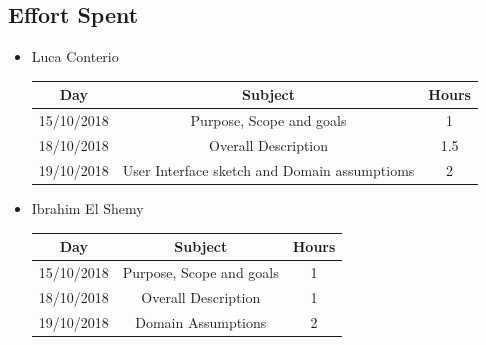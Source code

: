 \documentclass[12pt,a4paper]{article}
\begin{document}
	\subsection{Effort Spent}
		\begin{itemize}
			\item Luca Conterio
			\begin{center}
				\begin{tabular}{| c | c | c |}
					\hline
					Day & Subject & Hours \\ \hline
					15/10/2018 & Purpose, Scope and goals & 1 \\
					18/10/2018 & Overall Description & 1.5 \\
          19/10/2018  & User Interface sketch and Domain assumptioms & 2 \\
					\hline
				\end{tabular}
			\end{center}
		
			\item Ibrahim El Shemy
			\begin{center}
				\begin{tabular}{| c | c | c |}
					\hline
					Day & Subject & Hours \\ \hline
					15/10/2018 & Purpose, Scope and goals & 1 \\
					18/10/2018 & Overall Description & 1 \\
          19/10/2018  & Domain Assumptions & 2 \\
					\hline
				\end{tabular}
			\end{center}
		\end{itemize}
	
\end{document}
